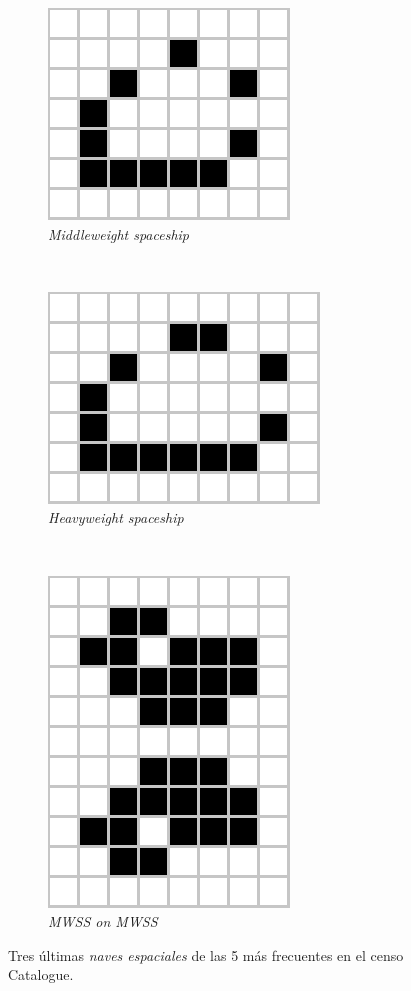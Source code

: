 \documentclass[../proyecto.tex]{memoir}
\begin{document}
\begin{figure}[H]
	\centering
	\begin{subfigure}[b]{0.3\linewidth} 
        \centering
        \includegraphics[height=0.45\linewidth]{./images/middleweightspaceship.png}
        \caption{\textit{Middleweight spaceship}}
        \label{fig:middleweightspaceship}
    \end{subfigure}
    \
	\begin{subfigure}[b]{0.3\linewidth} 
        \centering
        \includegraphics[height=0.45\linewidth]{./images/heavyweightspaceship.png}
        \caption{\textit{Heavyweight spaceship}}
        \label{fig:heavyweightspaceship}
    \end{subfigure}
    \\
	\begin{subfigure}[b]{0.3\linewidth} 
        \centering
        \includegraphics[height=0.65\linewidth]{./images/MWSS_on_MWSS.png}
        \caption{\textit{MWSS on MWSS}}
        \label{fig:mwss2}
    \end{subfigure}
	\caption{Tres últimas \textit{naves espaciales} de las 5 más frecuentes en el censo {Catalogue}.}
	\label{fig:congIniciales5}
\end{figure} 
\end{document}
